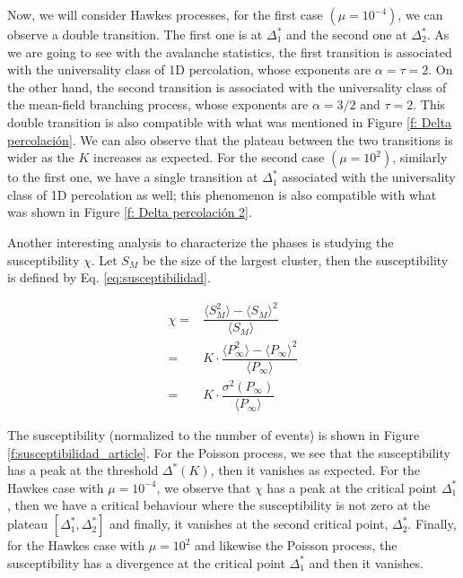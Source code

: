 Now, we will consider Hawkes processes, for the first case $\left( \mu=10^{-4} \right)$, we can observe a double transition. The first one is at $\Delta_1^*$ and the second one at 
$\Delta_2^*$. As we are going to see with the avalanche statistics, the first transition is associated with the universality class of 1D percolation, whose exponents are $\alpha=\tau=2$. 
On the other hand, the second transition is associated with the universality class of the mean-field branching process, whose exponents are $\alpha=3/2$ and $\tau=2$. This double transition 
is also compatible with what was mentioned in Figure \ref{f: Delta percolación}. We can also observe that the plateau between the two transitions is wider as the $K$ increases as expected.
For the second case $\left( \mu=10^2 \right)$, similarly to the first one, we have a single transition at $\Delta_1^*$ associated with the universality class of 1D percolation
as well; this phenomenon is also compatible with what was shown in Figure \ref{f: Delta percolación 2}.

Another interesting analysis to characterize the phases is studying the susceptibility $\chi$. Let $S_M$ be the size of the largest cluster, then the susceptibility is defined by 
Eq. \ref{eq:susceptibilidad}. 

\begin{equation}
    \begin{split}
        \chi =& \dfrac{ \langle S_M^2 \rangle - \langle S_M \rangle^2 }{\langle S_M \rangle}\\
             =& K\cdot \dfrac{\langle P_{\infty}^2 \rangle - \langle P_{\infty} \rangle^2}{\langle P_{\infty} \rangle}\\
             =& K\cdot \dfrac{\sigma^2\left( P_\infty \right)}{\langle P_{\infty} \rangle}
    \end{split}
    \label{eq:susceptibilidad}
\end{equation}

The susceptibility (normalized to the number of events) is shown in Figure \ref{f:susceptibilidad_article}. For the Poisson process, we see that the susceptibility has a peak at the
threshold $\Delta^*(K)$, then it vanishes as expected. For the Hawkes case with $\mu=10^{-4}$, we observe that $\chi$ has a peak at the critical point $\Delta_1^*$, then 
we have a critical behaviour where the susceptibility is not zero at the plateau $[\Delta_1^*,\Delta_2^*]$ and finally, it vanishes at the second critical point, $\Delta_2^*$. Finally, 
for the Hawkes case with $\mu=10^2$ and likewise the Poisson process, the susceptibility has a divergence at the critical point $\Delta_1^*$ and then it vanishes. 

